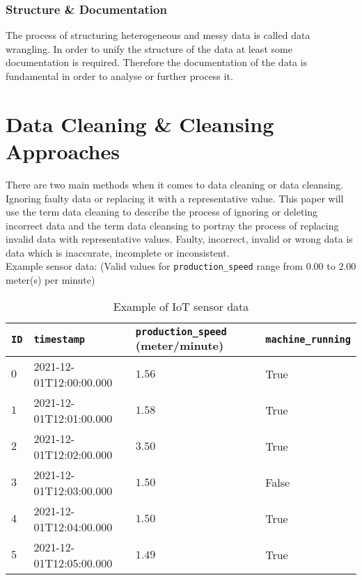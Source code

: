 \subsubsection{Structure \& Documentation}
The process of structuring heterogeneous and messy data is called data wrangling. In order to unify the structure of the data at least some documentation is required. Therefore the documentation of the data is fundamental in order to analyse or further process it. 

\section{Data Cleaning \& Cleansing Approaches}\label{section:data-cleaning-cleansing-approaches}
There are two main methods when it comes to data cleaning or data cleansing. Ignoring faulty data or replacing it with a representative value. This paper will use the term data cleaning to describe the process of ignoring or deleting incorrect data and the term data cleansing to portray the process of replacing invalid data with representative values. Faulty, incorrect, invalid or wrong data is data which is inaccurate, incomplete or inconsistent.\\
Example sensor data: (Valid values for \verb|production_speed| range from $0.00$ to $2.00$ meter(s) per minute)
\begin{table}[ht]
\begin{tabular}{|l|l|l|l|}
\hline
\verb|ID| & \verb|timestamp|        & \verb|production_speed| (meter/minute) & \verb|machine_running| \\ \hline
$0$       & 2021-12-01T12:00:00.000 & $1.56$                                 & True                   \\ \hline
$1$       & 2021-12-01T12:01:00.000 & $1.58$                                 & True                   \\ \hline
$2$       & 2021-12-01T12:02:00.000 & $3.50$                                 & True                   \\ \hline
$3$       & 2021-12-01T12:03:00.000 & $1.50$                                 & False                  \\ \hline
$4$       & 2021-12-01T12:04:00.000 & $1.50$                                 & True                   \\ \hline
$5$       & 2021-12-01T12:05:00.000 & $1.49$                                 & True                   \\ \hline
\end{tabular}
\caption{Example of IoT sensor data}
\label{table:example-iot-data}
\end{table}
